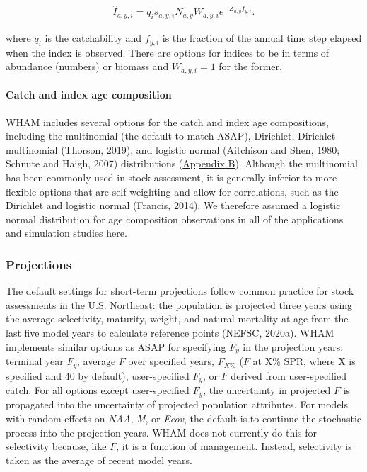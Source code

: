 \documentclass[]{article}
\let\oldparagraph\paragraph
\renewcommand{\paragraph}[1]{\oldparagraph{#1}\mbox{}}
\begin{document}
\begin{equation}
\label{eq:predindex}
  \begin{array}{c}
    \hat{I}_{a,y,i} = q_i s_{a,y,i} N_{a,y}W_{a,y,i} e^{-Z_{a,y}f_{y,i}}.
  \end{array}
\end{equation}

where \(q_i\) is the catchability and \(f_{y,i}\) is the fraction of the
annual time step elapsed when the index is observed. There are options
for indices to be in terms of abundance (numbers) or biomass and
\(W_{a,y,i} = 1\) for the former.

\hypertarget{catch-and-index-age-composition}{%
\paragraph{Catch and index age
composition}\label{catch-and-index-age-composition}}

WHAM includes several options for the catch and index age compositions,
including the multinomial (the default to match ASAP), Dirichlet,
Dirichlet-multinomial (Thorson, 2019), and logistic normal (Aitchison
and Shen, 1980; Schnute and Haigh, 2007) distributions
(\protect\hyperlink{appendix-b}{Appendix B}). Although the multinomial
has been commonly used in stock assessment, it is generally inferior to
more flexible options that are self-weighting and allow for
correlations, such as the Dirichlet and logistic normal (Francis, 2014).
We therefore assumed a logistic normal distribution for age composition
observations in all of the applications and simulation studies here.

\hypertarget{projections}{%
\subsubsection{Projections}\label{projections}}

The default settings for short-term projections follow common practice
for stock assessments in the U.S. Northeast: the population is projected
three years using the average selectivity, maturity, weight, and natural
mortality at age from the last five model years to calculate reference
points (NEFSC, 2020a). WHAM implements similar options as ASAP for
specifying \(F_y\) in the projection years: terminal year \(F_y\),
average \(F\) over specified years, \(F_{X\%}\) (\(F\) at X\% SPR, where
X is specified and 40 by default), user-specified \(F_y\), or \(F\)
derived from user-specified catch. For all options except user-specified
\(F_y\), the uncertainty in projected \(F\) is propagated into the
uncertainty of projected population attributes. For models with random
effects on \emph{NAA}, \emph{M}, or \emph{Ecov}, the default is to
continue the stochastic process into the projection years. WHAM does not
currently do this for selectivity because, like \(F\), it is a function
of management. Instead, selectivity is taken as the average of recent
model years.
\end{document}

